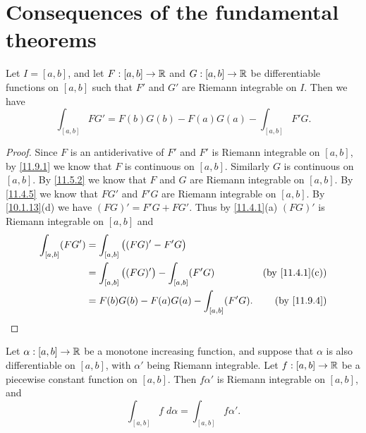 \section{Consequences of the fundamental theorems}\label{sec:11.10}

\begin{prop}\label{11.10.1}
  Let \(I = [a, b]\), and let \(F : [a, b] \to \mathbb{R}\) and \(G : [a, b] \to \mathbb{R}\) be differentiable functions on \([a, b]\) such that \(F'\) and \(G'\) are Riemann integrable on \(I\).
  Then we have
  \[
    \int_{[a, b]} F G' = F(b) G(b) - F(a) G(a) - \int_{[a, b]} F' G.
  \]
\end{prop}

\begin{proof}
  Since \(F\) is an antiderivative of \(F'\) and \(F'\) is Riemann integrable on \([a, b]\), by \cref{11.9.1} we know that \(F\) is continuous on \([a, b]\).
  Similarly \(G\) is continuous on \([a, b]\).
  By \cref{11.5.2} we know that \(F\) and \(G\) are Riemann integrable on \([a, b]\).
  By \cref{11.4.5} we know that \(F G'\) and \(F' G\) are Riemann integrable on \([a, b]\).
  By \cref{10.1.13}(d) we have \((FG)' = F' G + F G'\).
  Thus by \cref{11.4.1}(a) \((FG)'\) is Riemann integrable on \([a, b]\) and
  \begin{align*}
    \int_{[a, b]} (F G') & = \int_{[a, b]} \big((FG)' - F' G\big)                                                \\
                         & = \int_{[a, b]} \big((FG)'\big) - \int_{[a, b]} (F' G) & \text{(by \cref{11.4.1}(c))} \\
                         & = F(b) G(b) - F(a) G(a) - \int_{[a, b]} (F' G).        & \text{(by \cref{11.9.4})}
  \end{align*}
\end{proof}

\begin{thm}\label{11.10.2}
  Let \(\alpha : [a, b] \to \mathbb{R}\) be a monotone increasing function, and suppose that \(\alpha\) is also differentiable on \([a, b]\), with \(\alpha'\) being Riemann integrable.
  Let \(f : [a, b] \to \mathbb{R}\) be a piecewise constant function on \([a, b]\).
  Then \(f \alpha'\) is Riemann integrable on \([a, b]\), and
  \[
    \int_{[a, b]} f \; d \alpha = \int_{[a, b]} f \alpha'.
  \]
\end{thm}

